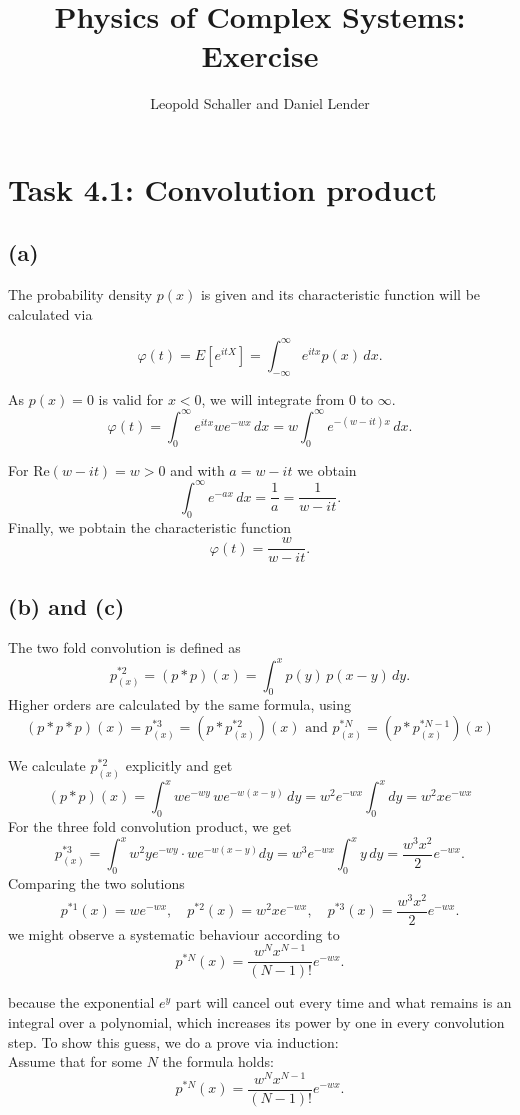 \documentclass{article}
\title{Physics of Complex Systems: Exercise }
\author{Leopold Schaller and Daniel Lender}
\begin{document}
\maketitle

\section*{Task 4.1: Convolution product}
\subsection*{(a)}

The probability density $p(x)$ is given and its characteristic function will be calculated via

\[
\varphi(t) = E[e^{itX}]
= \int_{-\infty}^{\infty} e^{itx} p(x)\, dx.
\]

As $p(x)=0$ is valid for $x<0$, we will integrate from 0 to $\infty$.
\[
\varphi(t)
= \int_0^\infty e^{itx} w e^{-wx}\, dx = w \int_0^\infty e^{-(w - it)x}\, dx.
\]

For $\mathrm{Re}(w-it)=w>0$ and with $a = w - it$ we obtain
\[
\int_0^\infty e^{-ax}\, dx = \frac{1}{a} = \frac{1}{w - it}.
\]
Finally, we pobtain the characteristic function
\[
\boxed{
\varphi(t)
= \frac{w}{w - it}.
}
\]

\subsection*{(b) and (c)}

The two fold convolution is defined as
\[
p^{*2}_{(x)} = (p * p)(x) = \int_0^x p(y)\,p(x-y)\,dy.
\]
Higher orders are calculated by the same formula, using
\[
    (p * p * p)(x) = p^{*3}_{(x)} = (p * p^{*2}_{(x)})(x) \text{ and } p^{*N}_{(x)} = (p * p^{*N-1}_{(x)})(x)
\]

We calculate $p^{*2}_{(x)}$ explicitly and get
\[
(p * p)(x)
= \int_0^x w e^{-wy}\, w e^{-w(x-y)}\,dy = w^2 e^{-wx} \int_0^x dy = w^2 x e^{-wx}
\]
For the three fold convolution product, we get
\[
 p^{*3}_{(x)} = \int_0^x w^2 y e^{-wy} \cdot w e^{-w(x-y)} dy = w^3 e^{-wx} \int_0^x y\, dy = \frac{w^3 x^2}{2} e^{-wx} .
\]
Comparing the two solutions
\[
p^{*1}(x)=w e^{-wx}, \quad
p^{*2}(x)=w^2 x e^{-wx}, \quad
p^{*3}(x)=\frac{w^3 x^2}{2} e^{-wx}.
\]
we might observe a systematic behaviour according to
\[
p^{*N}(x)
=
\frac{w^N x^{N-1}}{(N-1)!}
e^{-wx}.
\]

because the exponential $e^y$ part will cancel out every time and what remains is an integral over a polynomial,
which increases its power by one in every convolution step.
To show this guess, we do a prove via induction:
\\
Assume that for some $N$ the formula holds:
\[
p^{*N}(x)
=
\frac{w^N x^{N-1}}{(N-1)!}
e^{-wx}.
\]
\end{document}
